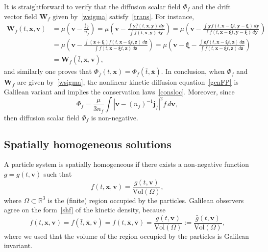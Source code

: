 \documentclass[12pt]{article}
\newcommand{\R}{\mathbb{R}}
\theoremstyle{definition}
\numberwithin{equation}{section}
\begin{document}
It is straightforward to verify that the diffusion scalar field $\Phi_f$ and the drift vector field ${\bm W}_f$ given by~\eqref{wsigma} satisfy~\eqref{trans}. For instance,
\begin{align*}
{\bm W}_{\bar{f}}(t,{\bm x},{\bm v})&=\mu\left({\bm v}-\frac{{\bm j}_{\bar{f}}}{n_{\bar{f}}}\right)=\mu\left({\bm v}-\frac{\displaystyle{\int} {\bm y} \bar{f}(t,{\bm x}, {\bm y})\,d{\bm y}}{\displaystyle{\int} \bar{f}(t,{\bm x}, {\bm y})\,d{\bm y}}\right)=\mu \left({\bm v}-\frac{\displaystyle{\int} {\bm y} f(t,{\bm x}-{\bm \xi}t, {\bm y}-{\bm \xi})\,d{\bm y}}{\displaystyle{\int} f(t,{\bm x}-{\bm \xi}t, {\bm y}-{\bm \xi})\,d{\bm y}}\right)\\
&=\mu \left({\bm v}-\frac{\displaystyle{\int} ({\bm z}+{\bm \xi}) f(t,{\bm x}-{\bm \xi}t, {\bm z})\,d{\bm z}}{\displaystyle{\int} f(t,{\bm x}-{\bm\xi}t, {\bm z})\,d{\bm z}}\right)=\mu \left({\bm v}-{\bm \xi}-\frac{\displaystyle{\int} {\bm z} f(t,{\bm x}-{\bm\xi}t, {\bm z})\,d{\bm z}}{\displaystyle{\int} f(t,{\bm x}-{\bm\xi}t, {\bm z})\,d{\bm z}}\right)\\
&={\bm W}_f(\bar{t},\bar{{\bm x}}, \bar{{\bm v}}),
\end{align*}
and similarly one proves that $\Phi_{\bar{f}}(t,{\bm x})=\Phi_f(\bar{t},\bar{{\bm x}})$. In conclusion, when $\Phi_f$ and ${\bm W}_f$ are given by~\eqref{wsigma}, the nonlinear kinetic diffusion equation~\eqref{genFP} is Galilean variant and implies the conservation laws~\eqref{consloc}.
Moreover, since
\[
\Phi_f=\frac{\mu}{3n_f}\int \left|{\bm v}-(n_f)^{-1}{\bm j}_f\right|^2f\,d{\bm v},
\]
then diffusion scalar field $\Phi_f$ is non-negative.

\subsection*{Spatially homogeneous solutions}
A particle system is spatially homogeneous if there exists a non-negative function $g=g(t,{\bm v})$ such that 
\begin{equation}\label{shf}
f(t,{\bm x},{\bm v})=\frac{g(t,{\bm v})}{\mathrm{Vol}(\Omega)},
\end{equation}
where $\Omega\subset\R^3$ is the (finite) region occupied by the particles. 
Galilean observers agree on the form~\eqref{shf} of the kinetic density, because
\[
\bar{f}(t,{\bm x},{\bm v})=f(\bar{t},\bar{\bm x},\bar{\bm v})=f(t,\bar{\bm x},\bar{\bm v})=\frac{g(t,\bar{\bm v})}{\mathrm{Vol}(\Omega)}:=\frac{\bar{g}(t,\bm v)}{\mathrm{Vol}(\Omega)},
\]
where we used that the volume of the region occupied by the particles is Galilean invariant. 
\end{document}
